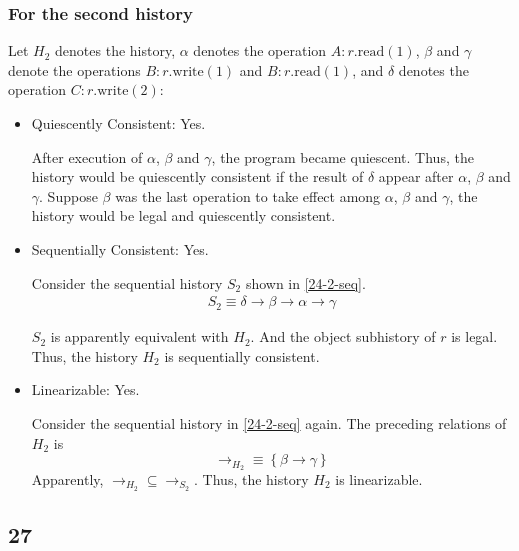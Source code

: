 \documentclass[]{article}
\begin{document}
\subsubsection*{For the second history}

Let $H_2$ denotes the history, $\alpha$ denotes the
operation $A:r.\mathrm{read}(1)$, $\beta$ and $\gamma$ denote the operations
$B:r.\mathrm{write}(1)$ and $B:r.\mathrm{read}(1)$, and $\delta$ denotes the
operation $C:r.\mathrm{write}(2)$:

\begin{itemize}
    \item Quiescently Consistent: Yes.

        After execution of $\alpha$, $\beta$ and $\gamma$, the program became
        quiescent. Thus, the history would be quiescently consistent if the
        result of $\delta$ appear after $\alpha$, $\beta$ and $\gamma$. Suppose
        $\beta$ was the last operation to take effect among $\alpha$, $\beta$
        and $\gamma$, the history would be legal and quiescently consistent.

    \item Sequentially Consistent: Yes.

        Consider the sequential history $S_2$ shown in \cref{24-2-seq}.
        \begin{align}
            \label{24-2-seq}
            S_2 \equiv \delta \rightarrow \beta \rightarrow \alpha \rightarrow \gamma
        \end{align}

        $S_2$ is apparently equivalent with $H_2$. And the object subhistory of
        $r$ is legal. Thus, the history $H_2$ is sequentially consistent.

    \item Linearizable: Yes.

        Consider the sequential history in \cref{24-2-seq} again. The preceding
        relations of $H_2$ is
        \[\rightarrow_{H_2} \equiv \left\{ \beta \rightarrow \gamma \right\}\]
        Apparently, $\rightarrow_{H_2} \subseteq \rightarrow_{S_2}$. Thus, the
        history $H_2$ is linearizable.
\end{itemize}

\subsection{27}
\end{document}

